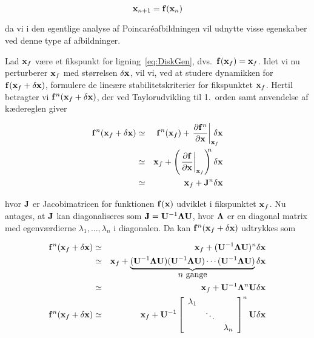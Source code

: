 \begin{equation}
 {\bf x}_{n+1} = {\bf f}({\bf x}_n)
 \label{eq:DiskGen}
\end{equation}

da vi i den egentlige analyse af Poincar\'{e}afbild\-ningen
vil udnytte visse egen\-skaber ved denne type af
afbild\-ninger.

\vspace{4.0mm}
Lad ${\bf x}_f$ v{\ae}re et fikspunkt for
ligning~\ref{eq:DiskGen}, dvs.\ ${\bf f}({\bf x}_f) = {\bf
x}_f$. Idet vi nu perturberer ${\bf x}_f$ med st{\o}rrelsen
$\delta{\bf x}$, vil vi, ved at studere dynamikken for
${\bf f}({\bf x}_f+\delta{\bf x})$, formulere de
line{\ae}re stabilitetskriterier for fikspunktet ${\bf
x}_f$. Hertil betragter vi ${\bf f}^n({\bf x}_f+\delta{\bf
x})$, der ved Taylorudvikling til 1.\ orden samt anvendelse
af k{\ae}dereglen giver

\begin{eqnarray}
{\bf f}^n({\bf x}_f+\delta{\bf x}) & \simeq &
{\bf f}^n({\bf x}_f) +
\left.
 \frac{\partial {\bf f}^n}{\partial {\bf x}}
\right|_{{\bf x}_f} \negsp\delta{\bf x} \nonumber\\
                                   & \simeq &
{\bf x}_f +
\left(
 \left.
  \frac{\partial {\bf f}}{\partial {\bf x}}
 \right|_{{\bf x}_f}
\right)^{\!\!\! n}\delta{\bf x} \nonumber\\
                                   & \simeq &
{\bf x}_f + {\bf J}^n\delta{\bf x}
\end{eqnarray}

hvor ${\bf J}$ er Jacobimatricen for funktionen ${\bf
f}({\bf x})$ udviklet i fikspunktet ${\bf x}_f$. Nu
antages, at ${\bf J}$ kan diagonaliseres som ${\bf J} =
{\bf U}^{-1}{\bf \Lambda}{\bf U}$, hvor ${\bf \Lambda}$ er
en diagonal matrix med egenv{\ae}rdierne
$\lambda_1,\ldots,\lambda_n$ i diagonalen. Da kan ${\bf
f}^n({\bf x}_f+\delta{\bf x})$ udtrykkes som

\begin{eqnarray}
{\bf f}^n({\bf x}_f+\delta{\bf x}) & \simeq & 
{\bf x}_f + ({\bf U}^{-1}{\bf \Lambda}
{\bf U})^n\delta{\bf x} \nonumber\\
& \simeq & 
{\bf x}_f + \underbrace{
 ({\bf U}^{-1}{\bf \Lambda}{\bf U})
 ({\bf U}^{-1}{\bf \Lambda}{\bf U})
 \cdots
 ({\bf U}^{-1}{\bf \Lambda}{\bf U})}_{\mbox{$n$ gange}}
\delta{\bf x}\nonumber\\
& \simeq & 
{\bf x}_f + {\bf U}^{-1}{\bf \Lambda}^n{\bf U}
\delta{\bf x}\nonumber\\
{\bf f}^n({\bf x}_f+\delta{\bf x}) & \simeq & 
{\bf x}_f + {\bf U}^{-1} 
\left[ 
 \begin{array}{ccc} \lambda_1 & & \\
         & \ddots &    \\
         & & \lambda_n 
 \end{array}
\right]^n {\bf U} \delta{\bf x}
\end{eqnarray}

